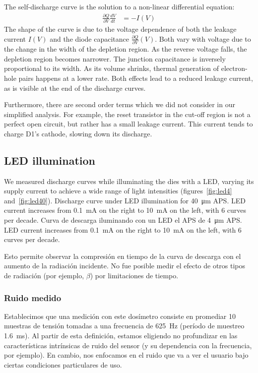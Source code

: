 The self-discharge curve is the solution to a non-linear differential equation:
\begin{align*}
    \frac{\partial Q}{\partial V}\frac{dV}{dt} &= -I(V)
\end{align*}
The shape of the curve is due to the voltage dependence of both 
the leakage current $I(V)$ 
and the diode capacitance $\frac{\partial Q}{\partial V}(V)$.
Both vary with voltage due to the change in the width of the depletion region.
As the reverse voltage falls,
the depletion region becomes narrower.
The junction capacitance is inversely proportional to its width.
As its volume shrinks,
thermal generation of electron-hole pairs happens at a lower rate.
Both effects lead to a reduced leakage current,
as is visible at the end of the discharge curves.

Furthermore, there are second order terms which we did not
consider in our simplified analysis.
For example,
the reset transistor in the cut-off region is not a perfect open circuit,
but rather has a small leakage current.
This current tends to charge D1's cathode,
slowing down its discharge.
%
\subsection{LED illumination}
We measured discharge curves while illuminating the dies with a LED,
varying its supply current to achieve a wide range of light intensities
(figures~\ref{fig:led4} and~\ref{fig:led40}).
{Discharge curve under LED illumination for \SI{40}{\micro\meter} APS.
LED current increases from \SI{.1}{\milli\ampere} on the right to \SI{10}{\milli\ampere} on the left,
with 6 curves per decade.}
{Curva de descarga iluminando con un LED el APS de \SI{4}{\micro\meter} APS.
LED current increases from \SI{.1}{\milli\ampere} on the right to \SI{10}{\milli\ampere} on the left,
with 6 curves per decade.}

Esto permite observar la compresión en tiempo de la curva de descarga 
con el aumento de la radiación incidente.
No fue posible medir el efecto de otros tipos de radiación
(por ejemplo, $\beta$) por limitaciones de tiempo.
\subsubsection{Ruido medido}
Establecimos que una medición con este dosímetro consiste en promediar 10
muestras de tensión tomadas a una frecuencia de \SI{625}{\hertz} 
(período de muestreo \SI{1.6}{\milli\second}).
Al partir de esta definición,
estamos eligiendo no profundizar en
las características intrínsicas de ruido del sensor
(y su dependencia con la frecuencia, por ejemplo).
En cambio, nos enfocamos en el ruido que va a ver el usuario bajo ciertas
condiciones particulares de uso.

